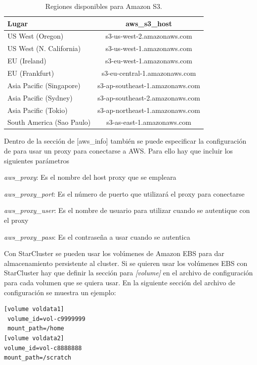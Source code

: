 \documentclass{article}
\begin{document}
\begin{table}[h]
	\begin{center}
		\caption{Regiones disponibles para Amazon S3.}
		\begin{tabular}{|l|c|}
\hline
\textbf{Lugar} &
\textbf{aws\_s3\_host} \\ \hline
\hline
US West (Oregon)            &  s3-us-west-2.amazonaws.com \\ \hline
US West (N. California)     &  s3-us-west-1.amazonaws.com \\ \hline
EU (Ireland)                       &  s3-eu-west-1.amazonaws.com \\ \hline
EU (Frankfurt)                   & s3-eu-central-1.amazonaws.com \\ \hline
Asia Pacific (Singapore)     & s3-ap-southeast-1.amazonaws.com \\ \hline
Asia Pacific (Sydney)         & s3-ap-southeast-2.amazonaws.com \\ \hline
Asia Pacific (Tokio)            & s3-ap-northeast-1.amazonaws.com \\ \hline
South America (Sao Paulo) & s3-as-east-1.amazonaws.com \\ \hline
		\end{tabular}
		\label{tab:s3-endpoint}
	\end{center}
\end{table}

	Dentro de la sección de [aws\_info] también se puede especificar la configuración de para usar un proxy para conectarse a AWS. Para ello hay que incluir los siguientes parámetros
{\setlength{\parskip}{0mm} \begin{itemize}
{\setlength{\parskip}{0mm}
	\item 	\emph{aws\_proxy}: Es el nombre del host proxy que se empleara
	\item 	\emph{aws\_proxy\_port}: Es el número de puerto que utilizará el proxy para conectarse
	\item 	\emph{aws\_proxy\_user}: Es el nombre de usuario para utilizar cuando se autentique con el proxy
	\item 	\emph{aws\_proxy\_pass}: Es el contraseña a usar cuando se autentica 
}\end{itemize} }

	Con StarCluster se pueden usar los volúmenes de Amazon EBS para dar almacenamiento persistente al cluster. Si se quieren usar los volúmenes EBS con StarCluster hay que definir la sección para \emph{[volume]} en el archivo de configuración para cada volumen que se quiera usar. En la siguiente sección del archivo de configuración se muestra un ejemplo:
\begin{lstlisting}
[volume voldata1]
 volume_id=vol-c9999999
 mount_path=/home
[volume voldata2]
volume_id=vol-c8888888
mount_path=/scratch
\end{lstlisting}
\end{document}
